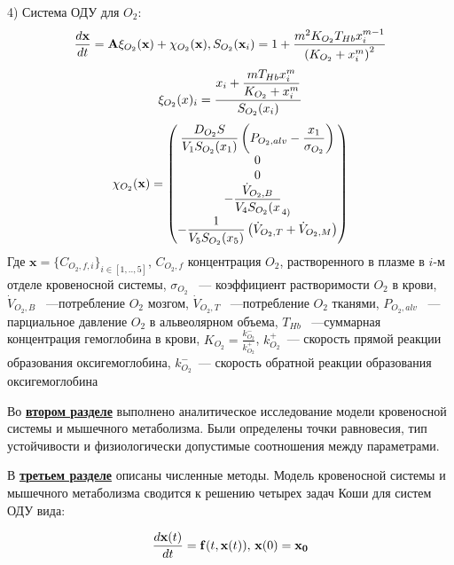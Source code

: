 4) Система ОДУ для $O_{2}$:
\begin{equation}
\displaystyle \frac{d\textbf{x}}{dt}
=\mathbf{A} \mathbf{\xi}_{O_{2}}(\textbf{x})+\mathbf{\chi}_{O_{2}}(\textbf{x}), S_{O_{2}}(\textbf{x}_{i})=1+\frac{m^2K_{O_{2}}T_{Hb}x_{i}^{m-1}}{\left( K_{O_{2}}+x_{i}^m\right)^2}\notag
\end{equation}
\begin{equation}
\mathbf{\xi}_{O_{2}}(x)_{i}=\frac{\displaystyle x_{i}+\frac{m T_{Hb}x_{i}^{m}}{ K_{O_{2}}+x_{i}^m}}{S_{O_{2}}(x_{i})}\notag
\end{equation}
\begin{equation}
\mathbf{\chi}_{O_{2}}(\textbf{x})=\begin{pmatrix}
\displaystyle \frac{D_{O_{2}}S}{V_{1}S_{O_{2}}(x_{1})}\left(P_{O_{2},alv}-\frac{x_{1}}{\sigma_{O_{2}}} \right) \\
0 \\
0 \\
\displaystyle -\frac{\dot{V}_{O_{2},B}}{V_{4}S_{O_{2}}(x}_{4)} \\
\displaystyle -\frac{1}{V_{5}S_{O_{2}}(x_{5})}\left(\dot{V}_{O_{2},T}+\dot{V}_{O_{2},M}\right)
\end{pmatrix}\notag
\end{equation}
Где $\mathbf{x}=\{ C_{O_{2},f,i} \}_{i \in [1,..,5]}$, $C_{O_2,f}$ концентрация $O_2$, растворенного в плазме в $i$-м отделе кровеносной системы, \( \sigma_{O_{2}} \) ~--- коэффициент растворимости \( O_{2}\) в крови, \( \dot{V}_{O_{2},B}\) ~---потребление \( O_{2}\) мозгом, \( \dot{V}_{O_{2},T}\) ~---потребление \( O_{2}\) тканями, \( P_{O_{2},alv} \) ~--- парциальное давление \( O_{2}\) в альвеолярном объема, $T_{Hb}$ ~---суммарная концентрация гемоглобина в крови, $K_{O_{2}}=\frac{k_{O_{2}}^{-}}{k_{O_{2}}^{+}}$, \( k_{O_{2}}^{+}\)~--- скорость прямой реакции образования оксигемоглобина, \( k_{O_{2}}^{-}\)~--- скорость обратной реакции образования оксигемоглобина

Во \underline{\textbf{втором разделе}} выполнено аналитическое исследование модели кровеносной системы и мышечного метаболизма. Были определены точки равновесия, тип устойчивости и физиологически допустимые соотношения между параметрами.

В \underline{\textbf{третьем разделе}} описаны численные методы.
Модель кровеносной системы и мышечного метаболизма сводится к решению четырех задач Коши для систем ОДУ вида:

\begin{equation} \label{eq:Koshi}
\frac{d\mathbf{x}(t)}{dt}=\mathbf{f}(t,\mathbf{x}(t)), \, \mathbf{x}(0)=\mathbf{x_0}\notag
\end{equation}

